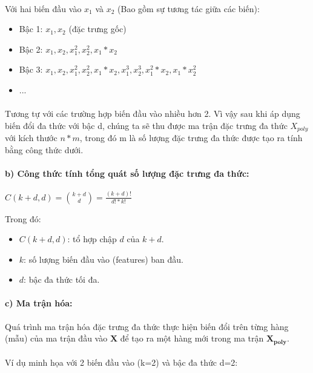\paragraph{}{Với hai biến đầu vào $x_1$ và $x_2$ (Bao gồm sự tương tác giữa các biến):}
\begin{itemize}
    \item Bậc 1: $x_1, x_2$ (đặc trưng gốc)
    \item Bậc 2: $x_1, x_2, x_1^2, x_2^2, x_1*x_2$
    \item Bậc 3: $x_1, x_2, x_1^2, x_2^2, x_1*x_2, x_1^3, x_2^3, x_1^2*x_2, x_1*x_2^2$
    \item ...
\end{itemize}
\paragraph{}{Tương tự với các trường hợp biến đầu vào nhiều hơn 2. Vì vậy sau khi áp dụng biến đổi đa thức với bậc d, chúng ta sẽ thu được ma trận đặc trưng đa thức $X_{poly}$ với kích thước $n*m$, trong đó m là số lượng đặc trưng đa thức được tạo ra tính bằng công thức dưới.}

\paragraph{b) Công thức tính tổng quát số lượng đặc trưng đa thức:}{}
\begin{center}
\large $C(k + d, d) = \binom{k + d}{d} = \frac{(k + d)!}{d! * k!}$
\end{center}
Trong đó:
\begin{itemize}
    \item $C(k + d, d)$: tổ hợp chập $d$ của $k + d$.
    \item $k$: số lượng biến đầu vào (features) ban đầu.
    \item $d$: bậc đa thức tối đa.
\end{itemize}

\paragraph{c) Ma trận hóa:}{Quá trình ma trận hóa đặc trưng đa thức thực hiện biến đổi trên từng hàng (mẫu) của ma trận đầu vào $\mathbf{X}$ để tạo ra một hàng mới trong ma trận $\mathbf{X_{poly}}$.}

\paragraph{}{Ví dụ minh họa với 2 biến đầu vào (k=2) và bậc đa thức d=2:}

